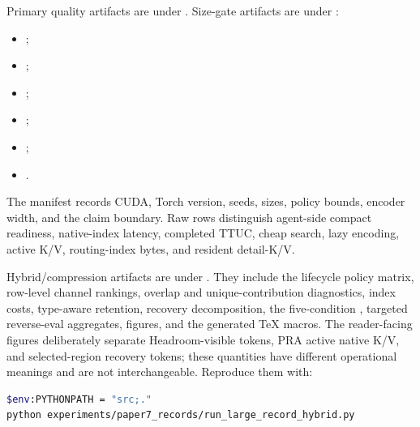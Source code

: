 \documentclass[11pt]{article}
\begin{document}
Primary quality artifacts are under
.
Size-gate artifacts are under
:
\begin{itemize}[leftmargin=*,nosep]
  \item {};
  \item {};
  \item {};
  \item {};
  \item {};
  \item {}.
\end{itemize}
The manifest records CUDA, Torch version, seeds, sizes, policy bounds, encoder
width, and the claim boundary. Raw rows distinguish agent-side compact
readiness, native-index latency, completed TTUC, cheap search, lazy encoding,
active K/V, routing-index bytes, and resident detail-K/V.

Hybrid/compression artifacts are under
. They
include the lifecycle policy matrix, row-level channel rankings, overlap and
unique-contribution diagnostics, index costs, type-aware retention, recovery
decomposition, the five-condition ,
targeted reverse-eval aggregates, figures, and the generated TeX macros. The
reader-facing figures deliberately separate Headroom-visible tokens, PRA
active native K/V, and selected-region recovery tokens; these quantities have
different operational meanings and are not interchangeable. Reproduce them
with:

\begin{lstlisting}[language=bash]
$env:PYTHONPATH = "src;."
python experiments/paper7_records/run_large_record_hybrid.py
\end{lstlisting}
\end{document}
